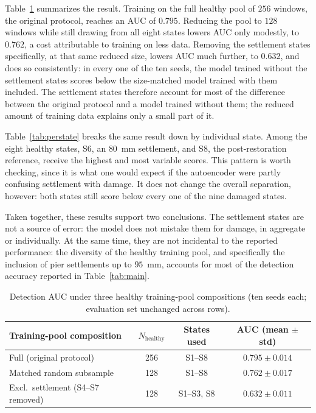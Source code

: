 \documentclass[11pt,a4paper]{article}
\begin{document}
Table~\ref{tab:settlement} summarizes the result. Training on the full
healthy pool of $256$ windows, the original protocol, reaches an AUC of
$0.795$. Reducing the pool to $128$ windows while still drawing from all
eight states lowers AUC only modestly, to $0.762$, a cost attributable to
training on less data. Removing the settlement states specifically, at that
same reduced size, lowers AUC much further, to $0.632$, and does so
consistently: in every one of the ten seeds, the model trained without the
settlement states scores below the size-matched model trained with them
included. The settlement states therefore account for most of the difference
between the original protocol and a model trained without them; the reduced
amount of training data explains only a small part of it.

Table~\ref{tab:perstate} breaks the same result down by individual state.
Among the eight healthy states, S6, an $80$~mm settlement, and S8, the
post-restoration reference, receive the highest and most variable scores.
This pattern is worth checking, since it is what one would expect if the
autoencoder were partly confusing settlement with damage. It does not change
the overall separation, however: both states still score below every one of
the nine damaged states.

Taken together, these results support two conclusions. The settlement states
are not a source of error: the model does not mistake them for damage, in
aggregate or individually. At the same time, they are not incidental to the
reported performance: the diversity of the healthy training pool, and
specifically the inclusion of pier settlements up to $95$~mm, accounts for
most of the detection accuracy reported in Table~\ref{tab:main}.

\begin{table}[htbp]
\color{red}
\centering
{}
\caption{Detection AUC under three healthy training-pool compositions (ten
seeds each; evaluation set unchanged across rows).}
\label{tab:settlement}
\small
\begin{tabular}{@{}lccc@{}}
\toprule
\textbf{Training-pool composition} & $N_{\text{healthy}}$ & \textbf{States used} & \textbf{AUC (mean $\pm$ std)} \\
\midrule
Full (original protocol)           & 256 & S1--S8      & $0.795 \pm 0.014$ \\
Matched random subsample           & 128 & S1--S8      & $0.762 \pm 0.017$ \\
Excl.\ settlement (S4--S7 removed) & 128 & S1--S3, S8  & $0.632 \pm 0.011$ \\
\bottomrule
\end{tabular}
\end{table}
\end{document}
